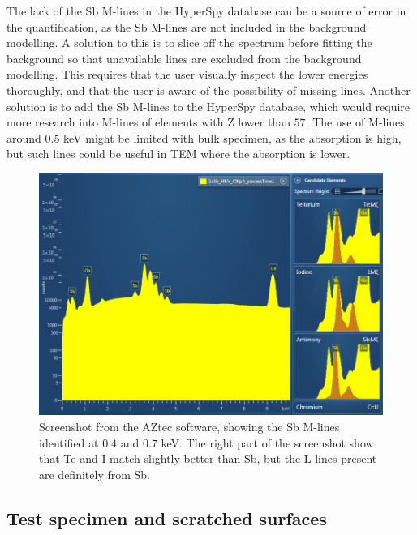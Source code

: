 The lack of the Sb M-lines in the HyperSpy database can be a source of error in the quantification, as the Sb M-lines are not included in the background modelling.
A solution to this is to slice off the spectrum before fitting the background so that unavailable lines are excluded from the background modelling.
This requires that the user visually inspect the lower energies thoroughly, and that the user is aware of the possibility of missing lines.
Another solution is to add the Sb M-lines to the HyperSpy database, which would require more research into M-lines of elements with Z lower than $57$.
The use of M-lines around 0.5 keV might be limited with bulk specimen, as the absorption is high, but such lines could be useful in TEM where the absorption is lower.

\begin{figure}[hbt]
    \centering
    \includegraphics[width=0.99\linewidth]{figures/discussion/AZtec_Mlines.png}
    \caption{
        Screenshot from the AZtec software, showing the Sb M-lines identified at $0.4$ and $0.7$ keV.
        The right part of the screenshot show that Te and I match slightly better than Sb, but the L-lines present are definitely from Sb.
    }
    \label{fig:discussion:AZtec_Mlines}
\end{figure}





\subsection{Test specimen and scratched surfaces}
\label{discussion:test_specimen}

